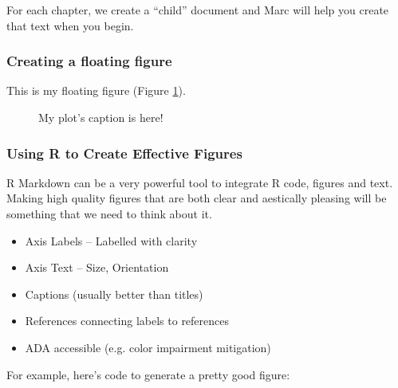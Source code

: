 \documentclass{book}\usepackage{knitr}
\begin{document}
For each chapter, we create a ``child'' document and Marc will help you create that text when you begin. 

\subsubsection{Creating a floating figure}

This is my floating figure (Figure \ref{fig:plot}).

\begin{figure}

\caption{My plot's caption is here!}
\label{fig:plot}
\end{figure}

\subsubsection{Using R to Create Effective Figures}

R Markdown can be a very powerful tool to integrate R code, figures and text. Making high quality figures that are both clear and aestically pleasing will be something that we need to think about it. 

\begin{itemize}
  \item Axis Labels -- Labelled with clarity 
  \item Axis Text -- Size, Orientation 
  \item Captions (usually better than titles)
  \item References connecting labels to references
  \item ADA accessible (e.g. color impairment mitigation)
\end{itemize}

For example, here's code to generate a pretty good figure: 
\end{document}
